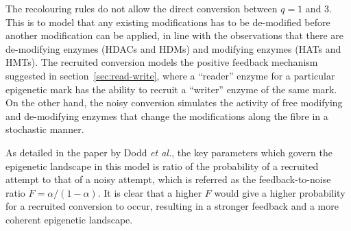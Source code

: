 \documentclass[12pt]{article}
\newcommand{\etal}{\emph{et al.}}
\begin{document}
The recolouring rules do not allow the direct conversion between $q = 1$ and 3. This is to model that any existing modifications has to be de-modified before another modification can be applied, in line with the observations that there are de-modifying enzymes (HDACs and HDMs) and modifying enzymes (HATs and HMTs). The recruited conversion models the positive feedback mechanism suggested in section~\ref{sec:read-write}, where a ``reader'' enzyme for a particular epigenetic mark has the ability to recruit a ``writer'' enzyme of the same mark. On the other hand, the noisy conversion simulates the activity of free modifying and de-modifying enzymes that change the modifications along the fibre in a stochastic manner.

As detailed in the paper by Dodd \etal, the key parameters which govern the epigenetic landscape in this model is ratio of the probability of a recruited attempt to that of a noisy attempt, which is referred as the feedback-to-noise ratio $F = \alpha / (1-\alpha)$. It is clear that a higher $F$ would give a higher probability for a recruited conversion to occur, resulting in a stronger feedback and a more coherent epigenetic landscape.

\begin{comment}
\subsubsection{Mapping between Simulation and Physical Time-Scale}


\subsubsection{Initialisation}
The simulations

\subsection{Model Implementation}

\subsection{Testing}



\section{Results and Discussion}



\section{Conclusion}
\end{comment}
\end{document}
